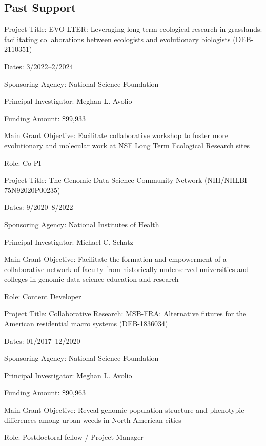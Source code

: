 \documentclass{cv}
\begin{document}
\subsection*{Past Support}

Project Title: EVO-LTER: Leveraging long-term ecological research in grasslands: facilitating collaborations between ecologists and evolutionary biologists (DEB-2110351)

Dates: 3/2022--2/2024

Sponsoring Agency: National Science Foundation

Principal Investigator: Meghan L. Avolio

Funding Amount: \$99,933

Main Grant Objective: Facilitate collaborative workshop to foster more evolutionary and molecular work at NSF Long Term Ecological Research sites

Role: Co-PI

\vspace{5mm}

Project Title: The Genomic Data Science Community Network (NIH/NHLBI 75N92020P00235)

Dates: 9/2020--8/2022

Sponsoring Agency: National Institutes of Health

Principal Investigator: Michael C. Schatz

Main Grant Objective: Facilitate the formation and empowerment of a collaborative network of faculty from historically underserved universities and colleges in genomic data science education and research

Role: Content Developer

\vspace{5mm}

Project Title: Collaborative Research: MSB-FRA: Alternative futures for the American residential macro systems (DEB-1836034)

Dates: 01/2017--12/2020

Sponsoring Agency: National Science Foundation

Principal Investigator: Meghan L. Avolio

Funding Amount: \$90,963

Main Grant Objective: Reveal genomic population structure and phenotypic differences among urban weeds in North American cities

Role: Postdoctoral fellow / Project Manager

\vspace{5mm}
\end{document}
